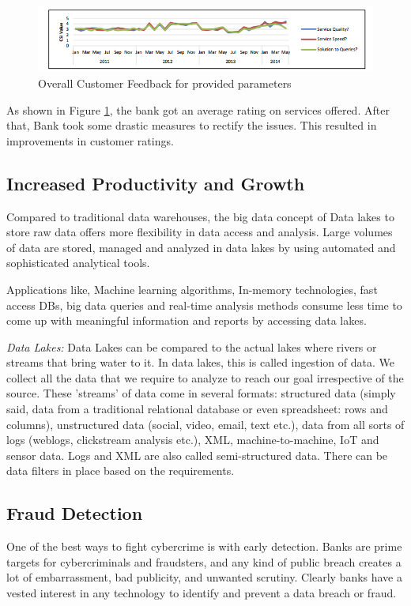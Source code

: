 \documentclass[sigconf]{acmart}
\begin{document}
\begin{figure}[htb]
  \centering
  \includegraphics[width=1.0\textwidth]{images/Figure2.png}
  \caption{Overall Customer Feedback for provided parameters 
  \cite{bigdata-banking}}
  \label{fig:Figure2} 
\end{figure}

As shown in Figure \ref{fig:Figure2}, the bank got an average rating on services offered. After that, Bank took some drastic measures to rectify the issues. This resulted in improvements in customer ratings.

\subsection{Increased Productivity and Growth}
Compared to traditional data warehouses, the big data concept of Data lakes to store raw data offers more flexibility in data access and analysis. Large volumes of data are stored, managed and analyzed in data lakes  by using automated and sophisticated analytical tools. 

Applications like, Machine learning algorithms, In-memory technologies, fast access DBs, big data queries and real-time analysis methods consume less time to come up with meaningful information and reports by accessing data lakes.

\textit{Data Lakes:} Data Lakes can be compared to the actual lakes where rivers or streams that bring water to it. In data lakes, this is called ingestion of data. We collect all the data that we require to analyze to reach our goal irrespective of the source. These 'streams' of data come in several formats: structured data (simply said, data from a traditional relational database or even spreadsheet: rows and columns), unstructured data (social, video, email, text etc.), data from all sorts of logs (weblogs, clickstream analysis etc.), XML, machine-to-machine, IoT and sensor data. Logs and XML are also called semi-structured data. There can be data filters in place based on the requirements\cite{data-lakes}.

\subsection{Fraud Detection}
One of the best ways to fight cybercrime is with early detection. Banks are prime targets for cybercriminals and fraudsters, and any kind of public breach creates a lot of embarrassment, bad publicity, and unwanted scrutiny. Clearly banks have a vested interest in any technology to identify and prevent a data breach or fraud\cite{the-top-5-trends-for-big-data-in-financial-services}.
\end{document}
